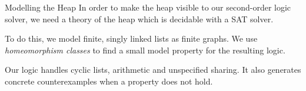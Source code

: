 \documentclass[xcolor=pdftex,t,11pt]{beamer}
\begin{document}
\begin{frame}{Modelling the Heap}
 In order to make the heap visible to our second-order logic solver, we need a
 theory of the heap which is decidable with a SAT solver.

 \vspace{1em}

 To do this, we model finite, singly linked lists as finite graphs.  We use
 \emph{homeomorphism classes} to find a small model property for the resulting logic.

 \vspace{1em}

 Our logic handles cyclic lists, arithmetic and unspecified sharing.  It also
 generates concrete counterexamples when a property does not hold.
\end{frame}
\end{document}

